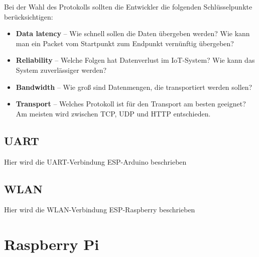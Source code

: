 \documentclass[12pt, letterpaper]{article}
\begin{document}
\par Bei der Wahl des Protokolls sollten die Entwickler die folgenden Schlüsselpunkte berücksichtigen:
\begin{itemize}
  \item[\textbullet] \textbf{Data latency} – Wie schnell sollen die Daten übergeben werden? Wie kann man ein Packet vom Startpunkt zum Endpunkt vernünftig übergeben?
  \item[\textbullet] \textbf{Reliability} – Welche Folgen hat Datenverlust im IoT-System? Wie kann das System zuverlässiger werden?
  \item[\textbullet] \textbf{Bandwidth} – Wie groß sind Datenmengen, die transportiert werden sollen?
  \item[\textbullet] \textbf{Transport} – Welches Protokoll ist für den Transport am besten geeignet? Am meisten wird zwischen TCP, UDP und HTTP entschieden.
\end{itemize}

\subsection{UART}
\par Hier wird die UART-Verbindung ESP-Arduino beschrieben
\subsection{WLAN}
\par Hier wird die WLAN-Verbindung ESP-Raspberry beschrieben

\section{Raspberry Pi}
\end{document}
